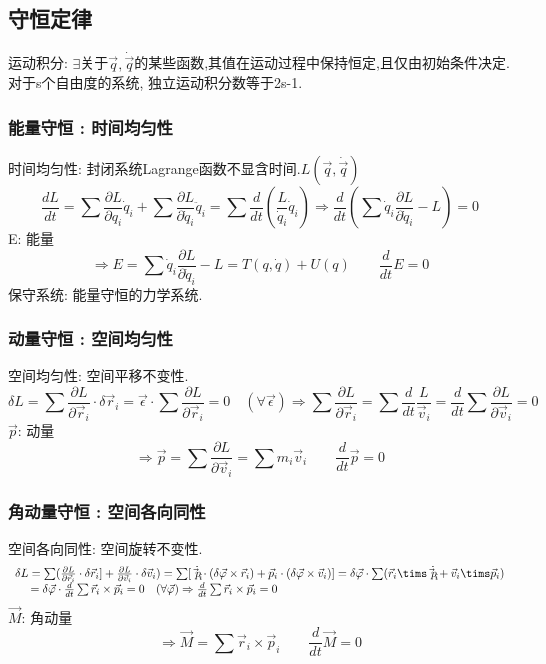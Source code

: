 \documentclass{article}
\begin{document}
\subsection{守恒定律}
运动积分: $\exists$关于$\vec q,\dot \vec q$的某些函数,其值在运动过程中保持恒定,且仅由初始条件决定.\\
对于s个自由度的系统, 独立运动积分数等于2s-1.\\


\subsubsection{能量守恒 : 时间均匀性}
时间均匀性: 封闭系统Lagrange函数不显含时间.\quad$L(\vec q,\dot \vec q)$\\
\[\frac{dL}{dt}
 = \sum \frac{\partial L}{\partial q_{i}} \dot q_{i} + \sum \frac{\partial L}{\partial \dot q_{i}} \ddot q_{i}
 = \sum \frac{d}{dt}(\frac{L}{\dot q_{i}}\dot q_{i})
\Rightarrow \frac{d}{dt}(\sum \dot q_{i} \frac{\partial L}{\partial \dot q_{i}} - L) = 0\]
E: 能量
\[\Rightarrow E = \sum \dot q_{i} \frac{\partial L}{\partial \dot q_{i}} - L
 = T(q,\dot q) + U(q)   \qquad \frac{d}{dt} E = 0\]
保守系统: 能量守恒的力学系统.\\


\subsubsection{动量守恒 : 空间均匀性}
空间均匀性: 空间平移不变性.\\
\[\delta L = \sum \frac{\partial L}{\partial \vec r_{i}}\cdot \delta \vec r_{i}
 = \vec \epsilon \cdot \sum \frac{\partial L}{\partial \vec r_{i}} = 0\quad(\forall \vec \epsilon)
\Rightarrow \sum \frac{\partial L}{\partial \vec r_{i}}
 = \sum \frac{d}{dt} \frac{L}{\vec v_{i}}
 = \frac{d}{dt} \sum \frac{\partial L}{\partial \vec v_{i}} = 0\]
$\vec p$: 动量
\[\Rightarrow \vec p = \sum \frac{\partial L}{\partial \vec v_{i}} = \sum m_{i} \vec v_{i}  \qquad \frac{d}{dt}\vec p = 0\]


\subsubsection{角动量守恒 : 空间各向同性}
空间各向同性: 空间旋转不变性.
\begin{displaymath}
\begin{array}{ll}
\delta L = \sum (\frac{\partial L}{\partial \vec r_{i}} \cdot \delta \vec r_{i}] + \frac{\partial L}{\partial \vec v_{i}} \cdot \delta \vec v_{i})
 = \sum [\dot{\vec p_{i}} \cdot (\delta \vec \varphi \times \vec r_{i}) + \vec p_{i} \cdot ( \delta \vec \varphi \times \vec v_{i} )]
 = \delta \vec \varphi \cdot \sum (\vec r_{i} \tims \dot{\vec p_{i}} + \vec v_{i} \tims \vec p_{i}) \\
 \quad\  = \delta \vec \varphi \cdot \frac{d}{dt} \sum \vec r_{i} \times \vec p_{i}
 = 0\quad(\forall \vec \varphi)
 \Rightarrow \frac{d}{dt}\sum \vec r_{i} \times \vec p_{i} = 0
\end{array}
\end{displaymath}
$\vec M$: 角动量
\[\Rightarrow \vec M = \sum \vec r_{i} \times \vec p_{i} \qquad \frac{d}{dt}\vec M = 0\]
\end{document}
